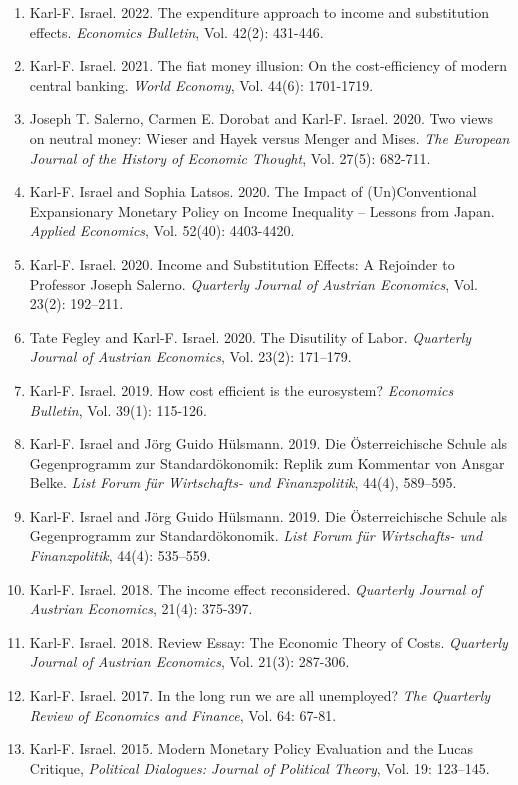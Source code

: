 \documentclass[11pt]{article}
\begin{document}
\begin{enumerate}
    \item Karl-F. Israel. 2022. The expenditure approach to income and substitution effects. \textit{Economics Bulletin}, Vol. 42(2): 431-446.
    \item Karl-F. Israel. 2021. The fiat money illusion: On the cost-efficiency of modern central banking. \textit{World Economy}, Vol. 44(6): 1701-1719.
    \item Joseph T. Salerno, Carmen E. Dorobat and Karl-F. Israel. 2020. Two views on neutral money: Wieser and Hayek versus Menger and Mises. \textit{The European Journal of the History of Economic Thought}, Vol. 27(5): 682-711.
    \item Karl-F. Israel and Sophia Latsos. 2020. The Impact of (Un)Conventional Expansionary Monetary Policy on Income Inequality – Lessons from Japan. \textit{Applied Economics}, Vol. 52(40): 4403-4420. 
    \item Karl-F. Israel. 2020. Income and Substitution Effects: A Rejoinder to Professor Joseph Salerno. \textit{Quarterly Journal of Austrian Economics}, Vol. 23(2): 192–211.
    \item Tate Fegley and Karl-F. Israel. 2020. The Disutility of Labor. \textit{Quarterly Journal of Austrian Economics}, Vol. 23(2): 171–179.
    \item Karl-F. Israel. 2019. How cost efficient is the eurosystem? \textit{Economics Bulletin}, Vol. 39(1): 115-126.
    \item Karl-F. Israel and Jörg Guido Hülsmann. 2019. Die Österreichische Schule als Gegenprogramm zur Standardökonomik: Replik zum Kommentar von Ansgar Belke. \textit{List Forum für Wirtschafts- und Finanzpolitik}, 44(4), 589–595.
    \item Karl-F. Israel and Jörg Guido Hülsmann. 2019. Die Österreichische Schule als Gegenprogramm zur Standardökonomik. \textit{List Forum für Wirtschafts- und Finanzpolitik}, 44(4): 535–559.
    \item Karl-F. Israel. 2018. The income effect reconsidered. \textit{Quarterly Journal of Austrian Economics}, 21(4): 375-397.
    \item Karl-F. Israel. 2018. Review Essay: The Economic Theory of Costs. \textit{Quarterly Journal of Austrian Economics}, Vol. 21(3): 287-306.
    \item Karl-F. Israel. 2017. In the long run we are all unemployed? \textit{The Quarterly Review of Economics and Finance}, Vol. 64: 67-81.
    \item Karl-F. Israel. 2015. Modern Monetary Policy Evaluation and the Lucas Critique, \textit{Political Dialogues: Journal of Political Theory}, Vol. 19: 123–145.
\end{enumerate}
\end{document}
